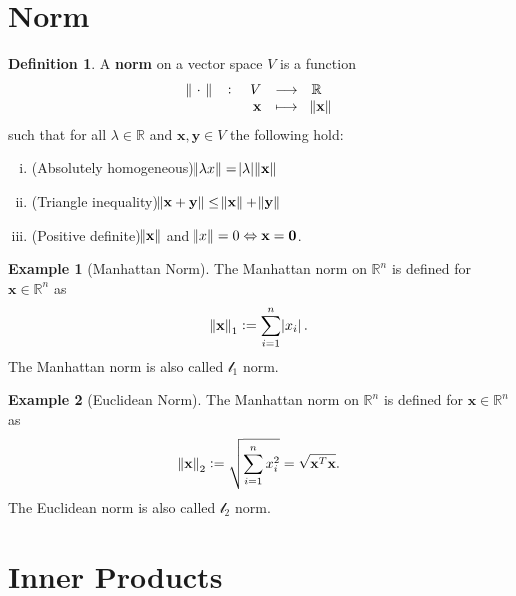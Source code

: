 \documentclass[12pt,openany]{book}
\theoremstyle{definition}
\newtheorem{definition}{Definition}[chapter]
\newtheorem{example}{Example}[chapter]
\newcommand{\R}{\mathbb{R}}
\begin{document}
	\section{Norm}
	\begin{tcolorbox}[colframe=defcolor,title={\color{white}\bf Norm}]
		\begin{definition}
			A \textbf{norm} on a vector space \(V\) is a function \[
			\fullfunction{\norm{\ \cdot\ }}{V}{\R}{\textbf{x}}{\norm{\textbf{x}}}
			\] such that for all \(\lambda\in\R\) and \(\textbf{x},\textbf{y}\in V\) the following hold: \begin{enumerate}[(i)]
				\item (Absolutely homogeneous)\quad \(\norm{\lambda x}=\abs{\lambda}\norm{\textbf{x}}\)
				\item (Triangle inequality)\quad \(\norm{\textbf{x}+\textbf{y}}\leq\norm{\textbf{x}}+\norm{\textbf{y}}\)
				\item (Positive definite)\quad \(\norm{\textbf{x}}\) and \(\norm{x}=0\Leftrightarrow\textbf{x}=\textbf{0}\).
			\end{enumerate}
		\end{definition}
	\end{tcolorbox}
	\vspace{8pt}
	\begin{example}[Manhattan Norm]
		The Manhattan norm on $\R^n$ is defined for $\textbf{x}\in\R^n$ as $$\norm{\textbf{x}}_1:=\sum_{i=1}^n\abs{x_i}.$$ The Manhattan norm is also called \(\mathscr{l}_1\) norm.
	\end{example}
	\begin{example}[Euclidean Norm]
		The Manhattan norm on $\R^n$ is defined for $\textbf{x}\in\R^n$ as $$\norm{\textbf{x}}_2:=\sqrt{\sum_{i=1}^nx_i^2}=\sqrt{\textbf{x}^T\textbf{x}}.$$ The Euclidean norm is also called \(\mathscr{l}_2\) norm.
	\end{example}

	\section{Inner Products}
\end{document}

